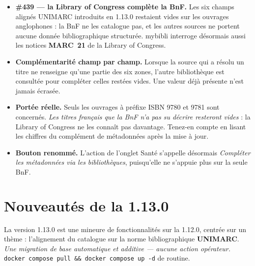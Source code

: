 \begin{itemize}
  \item \textbf{\#439 \string— la Library of Congress complète la
        BnF.} Les six champs alignés UNIMARC introduits en 1.13.0
        restaient vides sur les ouvrages anglophones : la BnF ne les
        catalogue pas, et les autres sources ne portent aucune donnée
        bibliographique structurée. mybibli interroge désormais aussi
        les notices \textbf{MARC~21} de la Library of Congress.
  \item \textbf{Complémentarité champ par champ.} Lorsque la source
        qui a résolu un titre ne renseigne qu'une partie des six
        zones, l'autre bibliothèque est consultée pour compléter
        celles restées vides. Une valeur déjà présente n'est jamais
        écrasée.
  \item \textbf{Portée réelle.} Seuls les ouvrages à préfixe ISBN
        9780 et 9781 sont concernés. \emph{Les titres français que la
        BnF n'a pas su décrire resteront vides} : la Library of
        Congress ne les connaît pas davantage. Tenez-en compte en
        lisant les chiffres du complément de métadonnées après la
        mise à jour.
  \item \textbf{Bouton renommé.} L'action de l'onglet Santé s'appelle
        désormais \emph{Compléter les métadonnées via les
        bibliothèques}, puisqu'elle ne s'appuie plus sur la seule
        BnF.
\end{itemize}

\section{Nouveautés de la 1.13.0}\label{sec:whats-new-1.13.0}

La version 1.13.0 est une mineure de fonctionnalités sur la 1.12.0,
centrée sur un thème : l'alignement du catalogue sur la norme
bibliographique \textbf{UNIMARC}. \emph{Une migration de base
automatique et additive — aucune action opérateur.} \texttt{docker
compose pull \&\& docker compose up -d} de routine.


